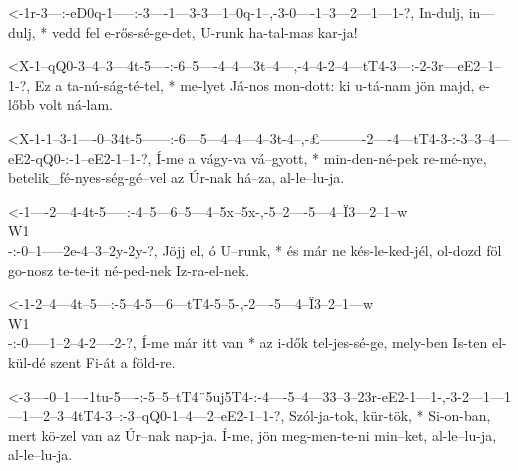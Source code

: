 
  {<-1r-3---:-eD0q-1-----:-3----1---3-3---1--0q-1--,-3-0----1--3---2---1---1-?,}
  {  In-dulj, in---dulj, * vedd fel e-rős-sé-ge-det, U-runk ha-tal-mas kar-ja!}


  {<X-1--qQ0-3--4--3---4t-5----:-6--5----4--4---3t--4---,-4--4-2--4---tT4-3---:-2-3r---eE2--1--1-?,}
  {   Ez a   ta-nú-ság-té-tel, * me-lyet Já-nos mon-dott: ki u-tá-nam jön majd, e-lőbb volt ná-lam.}




  {<X-1-1--3-1----0--34t-5------:-6---5---4--4---4--3t-4--,-£----------2----4---tT4-3-:-3--3--4---eE2-qQ0-:-1--eE2-1--1-?,}
  {   Í-me a vágy-va vá--gyott, * min-den-né-pek re-mé-nye, betelik_fé-nyes-ség-gé--vel az Úr-nak há--za,   al-le--lu-ja.}

  {<-1----2---4-4t-5-----:-4--5---6--5---4--5x--5x-,-5--2----5---4--Ï3---2--1--w\\W1\\-:-0--1---–2e-4--3--2y-2y-?,}
  {  Jöjj el, ó U--runk, * és már ne kés-le-ked-jél, ol-dozd föl go-nosz te-te-it        né-ped-nek Iz-ra-el-nek.}

  {<-1-2--4---4t--5---:-5--4-5---6---tT4-5--5-,-2----5---4--Ï3--2--1---w\\W1\\-:-0-----1--2--4-2----2-?,}
  {  Í-me már itt van * az i-dők tel-jes-sé-ge, mely-ben Is-ten el-kül-dé        szent Fi-át a föld-re.}


  {<-3----0--1----1tu-5----:-5--5--tT4¨5uj5T4-:-4----5--4---33--3--23r-eE2-1---1-,-3-2---1---1---1---2--3--4tT4-3--:-3--qQ0-1--4---2--eE2-1--1-?,}
  {  Szól-ja-tok, kür-tök, * Si-on-ban,         mert kö-zel van az Úr--nak nap-ja. Í-me, jön meg-men-te-ni min--ket, al-le--lu-ja, al-le--lu-ja.}


